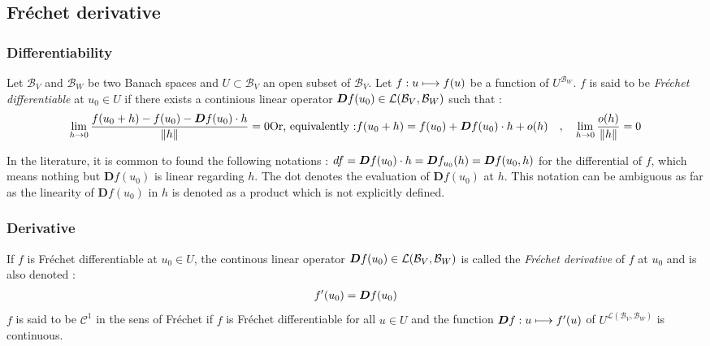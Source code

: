 \subsection{Fréchet derivative}
\subsubsection{Differentiability}
Let $\mathcal{B}_V$ and $\mathcal{B}_W$ be two Banach spaces and $U \subset \mathcal{B}_V$ an open subset of $\mathcal{B}_V$.
Let $f : u \longmapsto f(u)$ be a function of  $U^{\mathcal{B}_W}$.
$f$ is said to be \emph{Fréchet differentiable} at $u_0\in U$ if there exists a continious linear operator $\boldsymbol{D}f(u_0) \in
\mathcal{L}(\mathcal{B}_V,{\mathcal{B}_W})$ such that :
\begin{subequations}
\begin{align}
\lim_{h \to 0} \frac{f(u_0+h) - f(u_0)- \diffof{f}{u_0}{h}}{\|h\|} = 0
\end{align}
\text{Or, equivalently :}
\begin{align}
	f(u_0+h) = f(u_0) + \diffof{f}{u_0}{h} + o(h) \quad , \quad
	\lim_{h \to 0} \frac{o(h)}{\|h\|} = 0
\end{align}
\end{subequations}

In the literature, it is common to found the following notations : $df = \boldsymbol{D}f(u_0)\cdot h = \boldsymbol{D}f_{u_0}(h) = \boldsymbol{D}f(u_0,h)$ for the differential of $f$, which means nothing but $\boldsymbol{D}f(u_0)$ is linear regarding $h$. The dot denotes the evaluation of $\boldsymbol{D}f(u_0)$ at $h$. This notation can be ambiguous as far as the linearity of $\boldsymbol{D}f(u_0)$ in $h$ is denoted as a product which is not explicitly defined.

\subsubsection{Derivative}

If $f$ is Fréchet differentiable at $u_0 \in U$, the continous linear operator $\boldsymbol{D}f(u_0) \in
\mathcal{L}(\mathcal{B}_V,{\mathcal{B}_W})$ is called the \emph{Fréchet derivative} of $f$ at $u_0$ and is also denoted :
\begin{align}
	f'(u_0) = \boldsymbol{D}f(u_0)
\end{align}
$f$ is said to be $\mathcal{C}^1$ in the sens of Fréchet if $f$ is Fréchet differentiable for all $u \in U$ and the function $\boldsymbol{D}f : u \longmapsto f'(u)$ of $U^{\mathcal{L}(\mathcal{B}_V,{\mathcal{B}_W})}$ is continuous.

